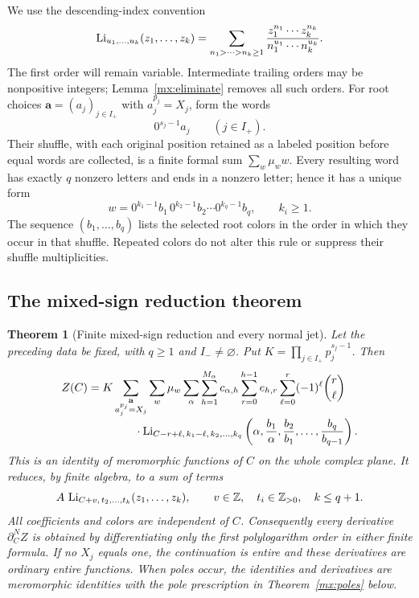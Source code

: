 \documentclass[11pt]{article}
\numberwithin{equation}{section}
\newtheorem{theorem}{Theorem}[section]
\theoremstyle{definition}
\theoremstyle{remark}
\begin{document}
We use the descending-index convention
\begin{equation}\label{mx:mpl}
 \operatorname{Li}_{u_1,\ldots,u_k}(z_1,\ldots,z_k)
 =\sum_{n_1>\cdots>n_k\geq1}
       \frac{z_1^{n_1}\cdots z_k^{n_k}}
            {n_1^{u_1}\cdots n_k^{u_k}}.
\end{equation}
The first order will remain variable.  Intermediate trailing orders
may be nonpositive integers; Lemma~\ref{mx:eliminate} removes all such
orders.  For root choices $\mathbf a=(a_j)_{j\in I_+}$ with
$a_j^{p_j}=X_j$, form the words
\[
 0^{s_j-1}a_j\qquad(j\in I_+).
\]
Their shuffle, with each original position retained as a labeled
position before equal words are collected, is a finite formal sum
$\sum_w\mu_w w$.  Every resulting word has exactly $q$ nonzero
letters and ends in a nonzero letter; hence it has a unique form
\begin{equation}\label{mx:word}
 w=0^{k_1-1}b_1\,0^{k_2-1}b_2\cdots0^{k_q-1}b_q,
 \qquad k_i\geq1.
\end{equation}
The sequence $(b_1,\ldots,b_q)$ lists the selected root colors in the
order in which they occur in that shuffle.  Repeated colors do not
alter this rule or suppress their shuffle multiplicities.

\subsection{The mixed-sign reduction theorem}

\begin{theorem}[Finite mixed-sign reduction and every normal jet]
\label{mx:main}
Let the preceding data be fixed, with $q\geq1$ and $I_-\ne\varnothing$.
Put $K=\prod_{j\in I_+}p_j^{s_j-1}$.  Then
\begin{align}\label{mx:mainformula}
 Z(C)={}&K\sum_{\substack{\mathbf a\\a_j^{p_j}=X_j}}
       \sum_w\mu_w\sum_\alpha\sum_{h=1}^{M_\alpha}
           c_{\alpha,h}
       \sum_{r=0}^{h-1}e_{h,r}\sum_{\ell=0}^r
           (-1)^\ell\binom r\ell\notag\\[-1mm]
 &\hspace{10mm}\cdot
 \mxLi_{C-r+\ell,\,k_1-\ell,\,k_2,\ldots,k_q}
 \left(\alpha,\frac{b_1}\alpha,
                  \frac{b_2}{b_1},\ldots,\frac{b_q}{b_{q-1}}\right).
\end{align}
This is an identity of meromorphic functions of $C$ on the whole
complex plane.  It reduces, by finite algebra, to a sum of terms
\begin{equation}\label{mx:positiveoutput}
 A\,\operatorname{Li}_{C+v,\,t_2,\ldots,t_k}(z_1,\ldots,z_k),
 \qquad v\in\mathbb Z,\quad t_i\in\mathbb Z_{>0},\quad k\leq q+1.
\end{equation}
All coefficients and colors are independent of $C$.  Consequently
every derivative $\partial_C^N Z$ is obtained by differentiating only
the first polylogarithm order in either finite formula.  If no $X_j$
equals one, the continuation is entire and these derivatives are
ordinary entire functions.  When poles occur, the identities and
derivatives are meromorphic identities with the pole prescription in
Theorem~\ref{mx:poles} below.
\end{theorem}
\end{document}
